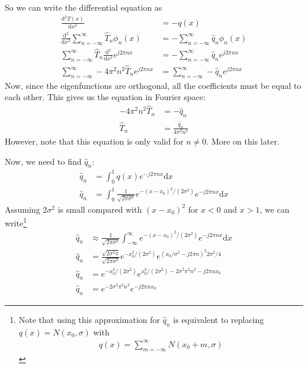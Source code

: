 \documentclass[twocolumn]{myarticle}
\renewcommand{\d}{\mathrm{d}}
\begin{document}
So we can write the differential equation as
\begin{align}
    \frac{\d^2 T(x)}{\d x^2} &= - q(x)
    \\
    \frac{\d^2}{\d x^2} \sum_{n = -\infty}^{\infty} \hat{T}_n \phi_n(x) &= -\sum_{n=-\infty}^{\infty} \hat{q}_n \phi_n(x)
    \\
    \sum_{n = -\infty}^{\infty} \hat{T}_n \frac{\d^2}{\d x^2} e^{j 2 \pi n x} &= -\sum_{n=-\infty}^{\infty} \hat{q}_n e^{j 2 \pi n x}
    \\
    \sum_{n = -\infty}^{\infty} - 4 \pi^2 n^2 \hat{T}_n e^{j 2 \pi n x} &= \sum_{n=-\infty}^{\infty} -\hat{q}_n e^{j 2 \pi n x}
\end{align}
Now, since the eigenfunctions are orthogonal, all the coefficients must be equal to each other.
This gives us the equation in Fourier space:
\begin{align}
    - 4 \pi^2 n^2 \hat{T}_n &= - \hat{q}_n \label{eq:fourier_de1}
    \\
    \hat{T}_n &= \frac{\hat{q}_n}{4 \pi^2 n^2}
\end{align}
However, note that this equation is only valid for $ n \neq 0 $.
More on this later.

Now, we need to find $ \hat{q}_n $:
\begin{align}
    \hat{q}_n &= \int_{0}^{1} q(x) e^{-j 2 \pi n x} \d x
    \\
    \hat{q}_n &= \int_{0}^{1} \frac{1}{\sqrt{2 \pi \sigma^2}} e^{-(x - x_0)^2/(2 \sigma^2)} e^{-j 2 \pi n x} \d x
\end{align}
Assuming $ 2 \sigma^2 $ is small compared with $ (x - x_0)^2 $ for $ x < 0 $ and $ x > 1 $, we can write\footnote{Note that using this approximation for $ \hat{q}_n $ is equivalent to replacing $ q(x) = N(x_0, \sigma) $ with \begin{align}q(x) = \sum_{m=-\infty}^{\infty} N(x_0 + m, \sigma) \nonumber \end{align}}
\begin{align}
    \hat{q}_n &\approx \frac{1}{\sqrt{2 \pi \sigma^2}} \int_{-\infty}^{\infty} e^{-(x - x_0)^2/(2 \sigma^2)} e^{-j 2 \pi n x} \d x
    \\
    \hat{q}_n &= \frac{\sqrt{2 \sigma^2 \pi}}{\sqrt{2 \pi \sigma^2}} e^{-x_0^2/(2\sigma^2)} e^{(x_0/\sigma^2 - j 2 \pi n  )^2 2 \sigma^2 / 4}
    \\
    \hat{q}_n &= e^{-x_0^2/(2\sigma^2)} e^{x_0^2/(2\sigma^2) - 2 \sigma^2 \pi^2 n^2 - j 2 \pi n x_0 }
    \\
    \hat{q}_n &= e^{- 2 \sigma^2 \pi^2 n^2} e^{- j 2 \pi n x_0 }
\end{align}
\end{document}

